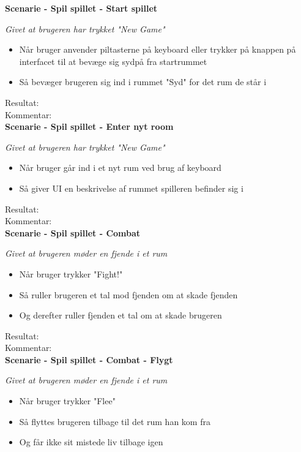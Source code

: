 \bf{Scenarie - Spil spillet - Start spillet}

\it{Givet at brugeren har trykket "New Game"}

\begin{itemize}
  \item Når bruger anvender piltasterne på keyboard eller trykker på knappen på interfacet til at bevæge sig sydpå fra startrummet
  \item Så bevæger brugeren sig ind i rummet "Syd" for det rum de står i
\end{itemize}

Resultat:\\
Kommentar:\\

\bf{Scenarie - Spil spillet - Enter nyt room}

\it{Givet at brugeren har trykket "New Game"}

\begin{itemize}
  \item Når bruger går ind i et nyt rum ved brug af keyboard
  \item Så giver UI en beskrivelse af rummet spilleren befinder sig i
\end{itemize}

Resultat:\\
Kommentar:\\

\bf{Scenarie - Spil spillet - Combat}

\it{Givet at brugeren møder en fjende i et rum}

\begin{itemize}
  \item Når bruger trykker "Fight!"
  \item Så ruller brugeren et tal mod fjenden om at skade fjenden
  \item Og derefter ruller fjenden et tal om at skade brugeren
\end{itemize}

Resultat:\\
Kommentar:\\

\bf{Scenarie - Spil spillet - Combat - Flygt}

\it{Givet at brugeren møder en fjende i et rum}

\begin{itemize}
  \item Når bruger trykker "Flee"
  \item Så flyttes brugeren tilbage til det rum han kom fra
  \item Og får ikke sit mistede liv tilbage igen
\end{itemize}

